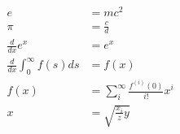 \documentclass{article}
\begin{document}
\begin{align}
e &= mc^2 \\
\pi &= \frac{c}{d} \\
\frac{d}{dx}e^x &= e^x \\
\frac{d}{dx}\int_{0}^{\infty} f(s)ds &= f(x) \\
f(x) &= \sum_{i}^\infty \frac{f^{(i)}(0)}{i!} x^i \\
x &= \sqrt{\frac{x_i}{z}y}
\end{align}
\end{document}
